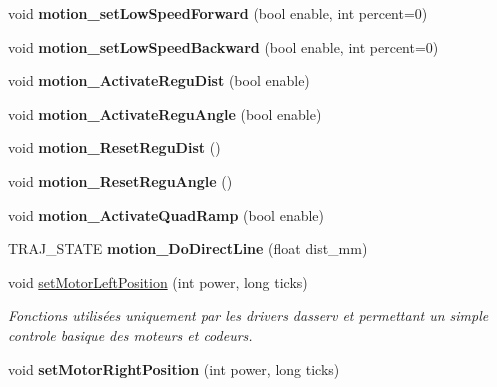 \begin{DoxyCompactItemize}
void {\bfseries motion\+\_\+set\+Low\+Speed\+Forward} (bool enable, int percent=0)
\item 
\mbox{\label{classAsservN_a8bda0ad281ee8e104f5fb1ea6983c6fa}} 
void {\bfseries motion\+\_\+set\+Low\+Speed\+Backward} (bool enable, int percent=0)
\item 
\mbox{\label{classAsservN_a9714a72d31b7b5d169009c8676da4bd2}} 
void {\bfseries motion\+\_\+\+Activate\+Regu\+Dist} (bool enable)
\item 
\mbox{\label{classAsservN_a821f9baea9c97984d8e7385ebd17dd16}} 
void {\bfseries motion\+\_\+\+Activate\+Regu\+Angle} (bool enable)
\item 
\mbox{\label{classAsservN_acdc87c81febd67e14e01e820b02b53b2}} 
void {\bfseries motion\+\_\+\+Reset\+Regu\+Dist} ()
\item 
\mbox{\label{classAsservN_abe603a1ba763fe3c97a79d880cbb6ac7}} 
void {\bfseries motion\+\_\+\+Reset\+Regu\+Angle} ()
\item 
\mbox{\label{classAsservN_a10fa49ea0b153e865a1c1b4bd104853d}} 
void {\bfseries motion\+\_\+\+Activate\+Quad\+Ramp} (bool enable)
\item 
\mbox{\label{classAsservN_ab3765e49ecbbd5aa9e471ff09bc7fb78}} 
T\+R\+A\+J\+\_\+\+S\+T\+A\+TE {\bfseries motion\+\_\+\+Do\+Direct\+Line} (float dist\+\_\+mm)
\item 
\mbox{\label{classAsservN_a4c1cc116ac5e19d0aa64716d9720fcca}} 
void \hyperlink{classAsservN_a4c1cc116ac5e19d0aa64716d9720fcca}{set\+Motor\+Left\+Position} (int power, long ticks)
\begin{DoxyCompactList}\small\item\em Fonctions utilisées uniquement par les drivers d\textquotesingle{}asserv et permettant un simple controle basique des moteurs et codeurs. \end{DoxyCompactList}\item 
\mbox{\label{classAsservN_ad0bd139b4905d99cc9d0aa36f79205d2}} 
void {\bfseries set\+Motor\+Right\+Position} (int power, long ticks)
\item 

\end{DoxyCompactItemize}
